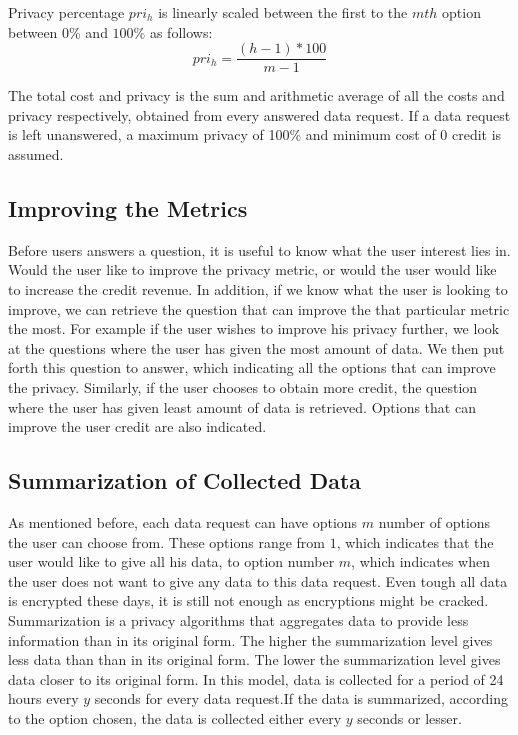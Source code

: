 Privacy percentage $pri_{h}$ is linearly scaled between the first to the $mth$ option between $0$\% and $100$\% as follows:
\begin{equation}
pri_{h} = \frac{(h-1) * 100}{m-1}
\end{equation}

The total cost and privacy is the sum and arithmetic average of all the costs and privacy respectively, obtained from every answered data request. If a data request is left unanswered, a maximum privacy of 100\% and minimum cost of 0 credit is assumed.


\subsection{Improving the Metrics}
Before users answers a question, it is useful to know what the user interest lies in. Would the user like to improve
the privacy metric, or would the user would like to increase the credit revenue. In addition, if we know what the user is looking to improve, we can retrieve the question that can improve the that particular metric the most.
For example if the user wishes to improve his privacy further, we look at the questions where the user has given the most amount of data. We then put forth this question to answer, which indicating all the options that can improve the privacy. Similarly, if the user chooses to obtain more credit, the question where the user has given least amount of data is retrieved. Options that can improve the user credit are also indicated.


\subsection{Summarization of Collected Data} \label{summa}
As mentioned before, each data request can have options $m$ number of options the user can choose from. These options range from $1$, which indicates that the user would like to give all his data, to option number $m$, which indicates when the user does not want to give any data to this data request. Even tough all data is encrypted these days, it is still not enough as encryptions might be cracked. Summarization is a privacy algorithms that aggregates data to provide less information than in its original form. The higher the summarization level gives less data than than in its original form. The lower the summarization level gives data closer to its original form. In this model, data is collected for a period of 24 hours every $y$ seconds for every data request.If the data is summarized, according to the option chosen, the data is collected either every $y$ seconds or lesser.

